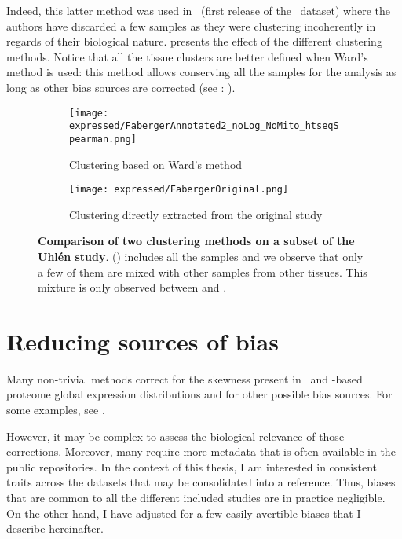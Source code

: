 Indeed, this latter method was used in~
(first release of the \uhlen\ dataset) where
the authors have discarded a few samples as they were clustering
incoherently in regards of their biological nature.
 presents the effect of the different clustering
methods.
Notice that all the tissue clusters are better defined when Ward's
method is used:
this method allows conserving all the samples for the analysis
as long as other bias sources are corrected (see : ).
\begin{figure}[!htpb]
    \centering
       \begin{subfigure}[hp]{0.70\textwidth}
       \centering \texttt{[image: expressed/FabergerAnnotated2\_noLog\_NoMito\_htseqSpearman.png]}
    \caption{Clustering based on Ward's method}\label{fig:FabergerRedone}
   \end{subfigure}

     \begin{subfigure}[hp]{0.70\textwidth}
      \centering \texttt{[image: expressed/FabergerOriginal.png]}
      \caption{Clustering directly extracted from the original study
      {\footnotesize {}}}\label{fig:fabergerOriginal}
       \end{subfigure}
    \caption[Comparison of two clustering methods on a subset of the \uhlen\ study]{%
    \textbf{Comparison of two clustering methods on a subset of the Uhlén study}.
    () includes all the samples and
    we observe that only a few of them are mixed with other samples from other tissues.
    This mixture is only observed between  and .
 }\label{fig:versusFaberger}
\end{figure}

\section{Reducing sources of bias}\label{sec:bias_sources}

Many non-trivial methods correct for the skewness present in
\Rnaseq\ and \ms-based proteome global expression distributions
and for other possible bias sources.
For some examples, see \citet{batchEffect,Leek2014-bl,Yi2018-rv,Li2014-cv,Stegle2012-td}.

However, it may be complex to assess the biological relevance of those corrections.
Moreover, many require more metadata that is often available in the public
repositories.
In the context of this thesis, I am interested in
consistent traits across the datasets that may be consolidated into a reference.
Thus, biases that are common to all the different included studies are in practice
negligible.
On the other hand, I have adjusted for a few easily avertible biases
that I describe hereinafter.


